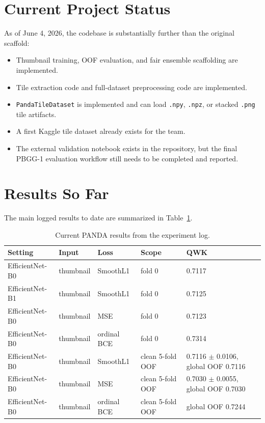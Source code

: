 \documentclass[11pt]{article}
\begin{document}
\section{Current Project Status}

As of June 4, 2026, the codebase is substantially further than the original scaffold:

\begin{itemize}[leftmargin=*]
    \item Thumbnail training, OOF evaluation, and fair ensemble scaffolding are implemented.
    \item Tile extraction code and full-dataset preprocessing code are implemented.
    \item \texttt{PandaTileDataset} is implemented and can load \texttt{.npy}, \texttt{.npz}, or stacked \texttt{.png} tile artifacts.
    \item A first Kaggle tile dataset already exists for the team.
    \item The external validation notebook exists in the repository, but the final PBGG-1 evaluation workflow still needs to be completed and reported.
\end{itemize}

\section{Results So Far}

The main logged results to date are summarized in Table~\ref{tab:results}.

\begin{table}[h]
\centering
\caption{Current PANDA results from the experiment log.}
\label{tab:results}
\begin{tabularx}{\textwidth}{l l l l X}
\toprule
Setting & Input & Loss & Scope & QWK \\
\midrule
EfficientNet-B0 & thumbnail & SmoothL1 & fold 0 & 0.7117 \\
EfficientNet-B1 & thumbnail & SmoothL1 & fold 0 & 0.7125 \\
EfficientNet-B0 & thumbnail & MSE & fold 0 & 0.7123 \\
EfficientNet-B0 & thumbnail & ordinal BCE & fold 0 & 0.7314 \\
EfficientNet-B0 & thumbnail & SmoothL1 & clean 5-fold OOF & 0.7116 $\pm$ 0.0106, global OOF 0.7116 \\
EfficientNet-B0 & thumbnail & MSE & clean 5-fold OOF & 0.7030 $\pm$ 0.0055, global OOF 0.7030 \\
EfficientNet-B0 & thumbnail & ordinal BCE & clean 5-fold OOF & global OOF 0.7244 \\
\bottomrule
\end{tabularx}
\end{table}
\end{document}
